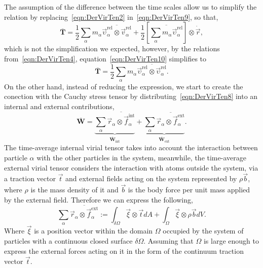 The assumption of the difference between the time scales allow us to simplify the relation by replacing~\eqref{eqn:DerVirTen2} in~\eqref{eqn:DerVirTen9}, so that,
\begin{equation}
    \overline{\mathbf{T}}=
        \frac{1}{2}\sum_\alpha m_\alpha\overline{\vec{\upsilon}_\alpha^{\mathrm{rel}}\otimes\vec{v}_\alpha^{\mathrm{rel}}}
        +
        \frac{1}{2} \left[\overline{\sum_\alpha m_\alpha\vec{\upsilon}_\alpha^{\mathrm{rel}}}\right]\otimes\dot{\vec{r}}\label{eqn:DerVirTen10},
\end{equation}
which is not the simplification we expected, however, by the relations from~\eqref{eqn:DerVirTen4}, equation~\eqref{eqn:DerVirTen10} simplifies to%
\begin{equation}
    \overline{\mathbf{T}}=
        \frac{1}{2}\sum_\alpha m_\alpha\overline{\vec{\upsilon}_\alpha^{\mathrm{rel}}\otimes\vec{\upsilon}_\alpha^{\mathrm{rel}}}\label{eqn:DerVirTen11}.
\end{equation}
On the other hand, instead of reducing the expression, we start to create the conection with the Cauchy stress tensor by distributing~\eqref{eqn:DerVirTen8} into an internal and external contributions,
\begin{equation}
    \overline{\mathbf{W}} = 
    \underbrace{\sum_\alpha\overline{\vec{r}_\alpha\otimes\vec{f}_\alpha^{\mathrm{int}}}}_{\overline{\mathbf{W}}_{\mathrm{int}}}
        +
        \underbrace{\sum_\alpha\overline{\vec{r}_\alpha\otimes\vec{f}_\alpha^{\mathrm{ext}}}}_{\overline{\mathbf{W}}_{\mathrm{ext}}}.\label{eqn:DerVirTen12}
\end{equation}
The time-average internal virial tensor takes into account the interaction between particle $\alpha$ with the other particles in the system, meanwhile, the time-average external virial tensor considers the interaction with atoms outside the system, via a traction vector $\vec{t}$ and external fields acting on the system represented by $\rho\vec{b}$, where $\rho$ is the mass density of it and $\vec{b}$ is the body force per unit mass applied by the external field.
Therefore we can express the following,
\begin{equation}
    \sum_\alpha\overline{\vec{r}_\alpha\otimes\vec{f}_\alpha^{\mathrm{ext}}}
    :=
    \int_{\delta\Omega}\vec{\xi}\otimes\vec{t}dA 
    +
    \int_{\Omega}\vec{\xi}\otimes\rho\vec{b}dV.\label{eqn:DerVirTen13}
\end{equation}
Where $\vec{\xi}$ is a position vector within the domain $\Omega$ occupied by the system of particles with a continuous closed surface $\delta\Omega$.
Assuming that $\Omega$ is large enough to express the external forces acting on it in the form of the continuum traction vector $\vec{t}$.

